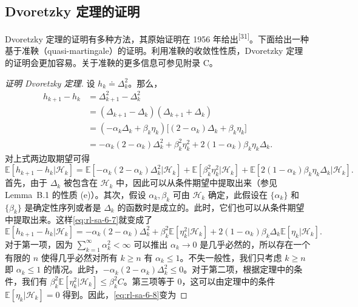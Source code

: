 \subsection{Dvoretzky 定理的证明}
\label{sec:rl-sa-dvor-proof}

Dvoretzky 定理的证明有多种方法，其原始证明在 1956 年给出\textsuperscript{[31]}。下面给出一种基于准鞅（quasi-martingale）的证明。利用准鞅的收敛性性质，Dvoretzky 定理的证明会更加容易。关于准鞅的更多信息可参见附录 C。

\begin{proof}[证明 Dvoretzky 定理]
设 $h_k \doteq \Delta_k^2$。那么，
\begin{equation}
\begin{aligned}
h_{k+1} - h_k &= \Delta_{k+1}^2 - \Delta_k^2 \\
&= (\Delta_{k+1} - \Delta_k)(\Delta_{k+1} + \Delta_k) \\
&= (-\alpha_k \Delta_k + \beta_k \eta_k) \big[ (2 - \alpha_k) \Delta_k + \beta_k \eta_k \big] \\
&= -\alpha_k (2 - \alpha_k) \Delta_k^2 + \beta_k^2 \eta_k^2 + 2 (1 - \alpha_k) \beta_k \eta_k \Delta_k.
\end{aligned}
\end{equation}
对上式两边取期望可得
\begin{equation}
\mathbb{E}[h_{k+1} - h_k | \mathcal{H}_k] = \mathbb{E}[-\alpha_k (2 - \alpha_k) \Delta_k^2 | \mathcal{H}_k] + \mathbb{E}[\beta_k^2 \eta_k^2 | \mathcal{H}_k] + \mathbb{E}[2 (1 - \alpha_k) \beta_k \eta_k \Delta_k | \mathcal{H}_k].
\label{eq:rl-sa-6-7}
\end{equation}
首先，由于 $\Delta_k$ 被包含在 $\mathcal{H}_k$ 中，因此可以从条件期望中提取出来（参见 Lemma~B.1 的性质 (e)）。其次，假设 $\alpha_k, \beta_k$ 可由 $\mathcal{H}_k$ 确定，此假设在 $\{\alpha_k\}$ 和 $\{\beta_k\}$ 是确定性序列或者是 $\Delta_k$ 的函数时是成立的。此时，它们也可以从条件期望中提取出来。这样\eqref{eq:rl-sa-6-7}就变成了
\begin{equation}
\mathbb{E}[h_{k+1} - h_k | \mathcal{H}_k] = -\alpha_k (2 - \alpha_k) \Delta_k^2 + \beta_k^2 \mathbb{E}[\eta_k^2 | \mathcal{H}_k] + 2 (1 - \alpha_k) \beta_k \Delta_k \mathbb{E}[\eta_k | \mathcal{H}_k].
\label{eq:rl-sa-6-8}
\end{equation}
对于第一项，因为 $\sum_{k=1}^{\infty} \alpha_k^2 < \infty$ 可以推出 $\alpha_k \to 0$ 是几乎必然的，所以存在一个有限的 $n$ 使得几乎必然对所有 $k \geqslant n$ 有 $\alpha_k \leqslant 1$。不失一般性，我们只考虑 $k \geqslant n$ 即 $\alpha_k \leqslant 1$ 的情况。此时，$-\alpha_k (2 - \alpha_k) \Delta_k^2 \leqslant 0$。对于第二项，根据定理中的条件，我们有 $\beta_k^2 \mathbb{E}[\eta_k^2 | \mathcal{H}_k] \leqslant \beta_k^2 C$。第三项等于 0，这可以由定理中的条件 $\mathbb{E}[\eta_k | \mathcal{H}_k] = 0$ 得到。因此，\eqref{eq:rl-sa-6-8}变为

\end{proof}
